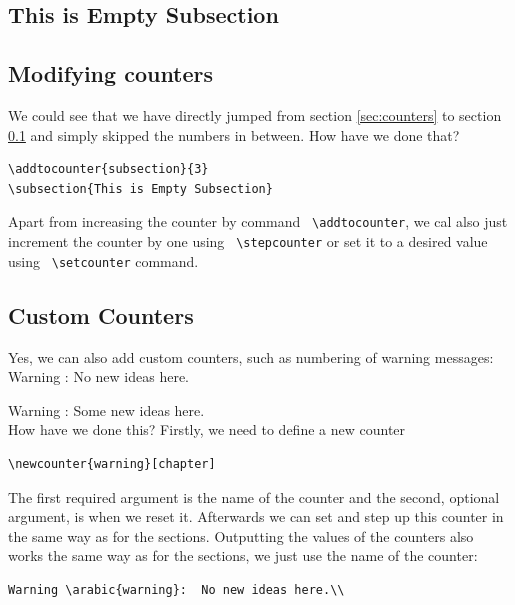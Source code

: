 \documentclass[a4paper,10pt]{report} %
\begin{document}
\subsection{This is Empty Subsection}\label{sec:empty}

\subsection{Modifying counters}

We could see that we have directly jumped from section \ref{sec:counters} to section \ref{sec:empty} and simply skipped the numbers in between.
How have we done that?
\begin{lstlisting}[language={[latex]tex},
  frame=single,
  basicstyle=\footnotesize\color{darkgray}, 
  keywordstyle=\bf\color{magenta},
  commentstyle=\color{ForestGreen},  %
  breaklines=true
  ]
\addtocounter{subsection}{3}
\subsection{This is Empty Subsection}  
\end{lstlisting}

Apart from increasing the counter by command \texttt{ \textbackslash addtocounter}, we cal also just increment the counter by one using \texttt{ \textbackslash stepcounter} or set it to a desired value using \texttt{ \textbackslash setcounter} command. 
  
\subsection{Custom Counters}
Yes, we can also add custom counters, such as numbering of warning messages:\\

 Warning :  No new ideas here.\\
 \addtocounter{warning}{4}
 Warning :  Some new ideas here.\\
 
 How have we done this? Firstly, we need to define a new counter
\begin{lstlisting}[language={[latex]tex}, 
  frame=single,
  basicstyle=\footnotesize\color{darkgray}, 
  keywordstyle=\bf\color{magenta},
  commentstyle=\color{ForestGreen},  %
  breaklines=true
  ]
  \newcounter{warning}[chapter] 
\end{lstlisting}
The first required argument is the name of the counter and the second, optional argument, is when we reset it.
Afterwards we can set and step up this counter in the same way as for the sections. Outputting the values  of the counters also works the same way as for the sections, we just use the name of the counter:
\begin{lstlisting}[language={[latex]tex}, frame=single,basicstyle=\footnotesize,
  keywordstyle=\bf,
  commentstyle=\it\color{gray}
  ]
  Warning \arabic{warning}:  No new ideas here.\\
\end{lstlisting}
\end{document}
